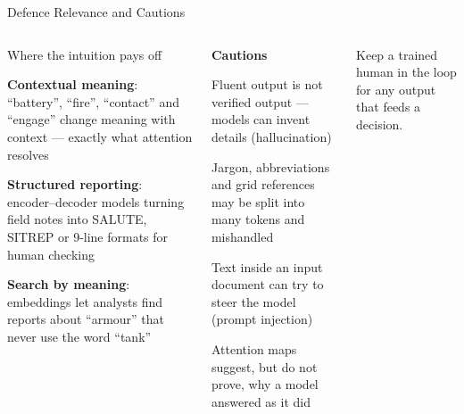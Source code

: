 \documentclass[aspectratio=169,10pt]{beamer}
\begin{document}
\begin{frame}{Defence Relevance and Cautions}
\begin{columns}[T]
\begin{cbox}{Where the intuition pays off}\scriptsize
\begin{tl}
\item \textbf{Contextual meaning}: ``battery'', ``fire'', ``contact'' and ``engage'' change meaning with context --- exactly what attention resolves
\item \textbf{Structured reporting}: encoder--decoder models turning field notes into SALUTE, SITREP or 9-line formats for human checking
\item \textbf{Search by meaning}: embeddings let analysts find reports about ``armour'' that never use the word ``tank''
\end{tl}
\end{cbox}
\begin{wbox}\scriptsize\textbf{Cautions}
\begin{tl}
\item Fluent output is not verified output --- models can invent details (hallucination)
\item Jargon, abbreviations and grid references may be split into many tokens and mishandled
\item Text inside an input document can try to steer the model (prompt injection)
\item Attention maps suggest, but do not prove, why a model answered as it did
\end{tl}\end{wbox}
\begin{rbox}\scriptsize Keep a trained human in the loop for any output that feeds a decision.\end{rbox}
\end{columns}
\end{frame}
\end{document}
